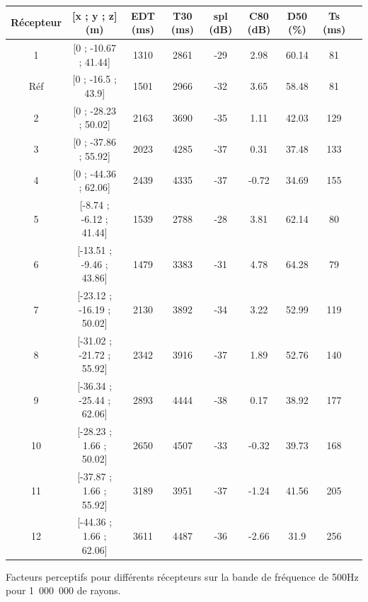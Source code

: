\begin{tableth} 
\footnotesize
 \begin{tabular}{| *{9}{c|}} 
 \hline 
 Récepteur & [x ; y ; z] (m)  & \gls{EDT} (ms) & \gls{T30} (ms) & \gls{spl} (dB) & \gls{C80} (dB) & \gls{D50} (\%) & \gls{Ts} (ms) \\ %
 \hline 
 \hline 
1  & [0 ; -10.67 ; 41.44] &1310  &2861   &-29  &2.98  &60.14  &81 \\%
 \hline 
 Réf    &[0 ; -16.5 ; 43.9] &1501  &2966   &-32  &3.65  &58.48  &81 \\%
 \hline 
 2  & [0 ; -28.23 ; 50.02] &2163  &3690   &-35  &1.11  &42.03  &129 \\ %
 \hline 
 3  &  [0 ; -37.86 ; 55.92] &2023  &4285   &-37  &0.31  &37.48  &133 \\ %
 \hline 
 4  &  [0 ; -44.36 ; 62.06] &2439  &4335   &-37  &-0.72  &34.69  &155 \\%
 \hline 
 \hline
 5  &   [-8.74 ; -6.12 ; 41.44] &1539  &2788   &-28  &3.81  &62.14  &80 \\%
 \hline 
 6  &  [-13.51 ; -9.46 ; 43.86] &1479  &3383   &-31  &4.78  &64.28  &79 \\%
  \hline 
  7 &   [-23.12 ; -16.19 ; 50.02] &2130  &3892   &-34  &3.22  &52.99  &119 \\ %
 \hline 
 8  &  [-31.02 ; -21.72 ; 55.92] &2342  &3916   &-37  &1.89  &52.76  &140 \\ %
 \hline 
 9  & [-36.34 ; -25.44 ; 62.06] &2893  &4444   &-38  &0.17  &38.92  &177 \\ %
 \hline 
 \hline
 10  &  [-28.23 ; 1.66 ; 50.02] &2650  &4507   &-33  &-0.32  &39.73  &168 \\ %
 \hline 
11   & [-37.87 ; 1.66 ; 55.92] &3189  & 3951  &-37  & -1.24 &41.56  &205 \\%
 \hline 
12   & [-44.36 ; 1.66 ; 62.06] &3611  & 4487  & -36 &-2.66  &31.9  & 256\\ %
 \hline 
\end{tabular} 
 \caption{Facteurs perceptifs pour différents récepteurs sur la bande de fréquence de 500Hz pour 1~000~000 de rayons.} 
 \label{tab_fac_rec} 
 \end{tableth}
 
